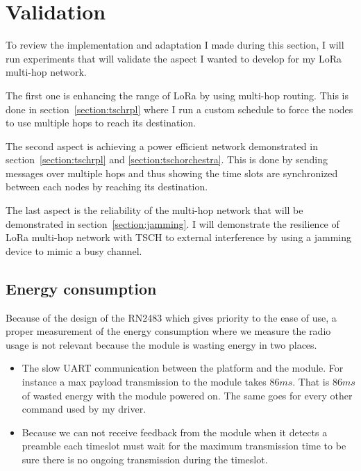 \section{Validation\label{section:tschtesting}}

To review the implementation and adaptation I made during this section, I will
run experiments that will validate the aspect I wanted to develop for my
LoRa multi-hop network.

The first one is enhancing the range of LoRa by using multi-hop routing.
This is done in section~\ref{section:tschrpl} where I run a custom schedule
to force the nodes to use multiple hops to reach its destination.

The second aspect is achieving a power efficient network demonstrated in
section~\ref{section:tschrpl} and \ref{section:tschorchestra}.
This is done by sending messages over multiple hops and thus showing the time
slots are synchronized between each nodes by reaching its destination.

The last aspect is the reliability of the multi-hop network that will be
demonstrated in section~\ref{section:jamming}. I will demonstrate the resilience
of LoRa multi-hop network with TSCH to external interference by using a jamming
device to mimic a busy channel.

\subsection{Energy consumption\label{section:energyconsumption}}

Because of the design of the RN2483 which gives priority to the ease of use,
a proper measurement of the energy consumption where we measure the radio
usage is not relevant because the module is wasting energy in two places.

\begin{itemize}
  \item The slow UART communication between the platform and the module. For
    instance a max payload transmission to the module takes $86 ms$.
    That is $86 ms$ of wasted energy with the module powered on. The same goes
    for every other command used by my driver.
  \item Because we can not receive feedback from the module when it detects a
    preamble each timeslot must wait for the maximum transmission time to be
    sure there is no ongoing transmission during the timeslot.
\end{itemize}

